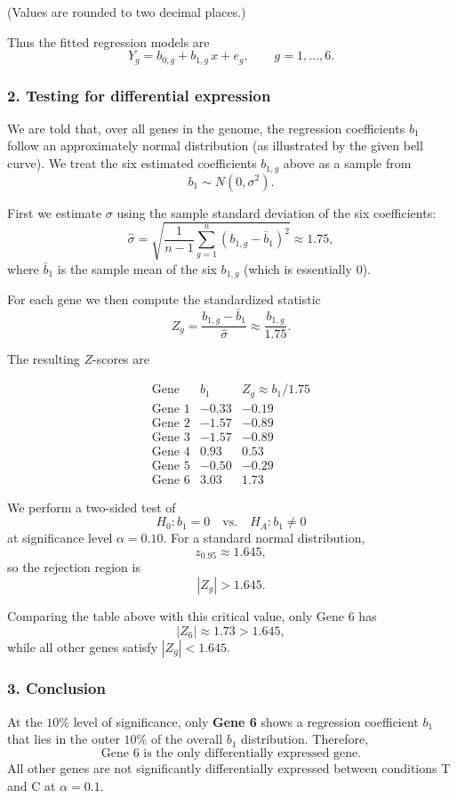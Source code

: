 (Values are rounded to two decimal places.)

Thus the fitted regression models are
\[
    Y_g = b_{0,g} + b_{1,g}\,x + e_g, \qquad g=1,\dots,6.
\]

\subsubsection*{2. Testing for differential expression}

We are told that, over all genes in the genome, the regression
coefficients $b_1$ follow an approximately normal distribution
(as illustrated by the given bell curve).  We treat the six
estimated coefficients $b_{1,g}$ above as a sample from
\[
    b_1 \sim N(0,\sigma^2).
\]

First we estimate $\sigma$ using the sample standard deviation of the six
coefficients:
\[
    \hat{\sigma}
    = \sqrt{\frac{1}{n-1}\sum_{g=1}^n (b_{1,g}-\bar{b}_1)^2}
    \approx 1.75,
\]
where $\bar{b}_1$ is the sample mean of the six $b_{1,g}$
(which is essentially $0$).

For each gene we then compute the standardized statistic
\[
    Z_g = \frac{b_{1,g}-\bar{b}_1}{\hat{\sigma}}
    \approx \frac{b_{1,g}}{1.75}.
\]

The resulting $Z$-scores are

\[
    \begin{array}{c|cc}
        \text{Gene}   & b_1   & Z_g \approx b_1/1.75 \\ \hline
        \text{Gene 1} & -0.33 & -0.19                \\
        \text{Gene 2} & -1.57 & -0.89                \\
        \text{Gene 3} & -1.57 & -0.89                \\
        \text{Gene 4} & 0.93  & 0.53                 \\
        \text{Gene 5} & -0.50 & -0.29                \\
        \text{Gene 6} & 3.03  & 1.73
    \end{array}
\]

We perform a two-sided test of
\[
    H_0: b_1 = 0 \quad \text{vs.} \quad H_A: b_1 \neq 0
\]
at significance level $\alpha = 0.10$.
For a standard normal distribution,
\[
    z_{0.95} \approx 1.645,
\]
so the rejection region is
\[
    |Z_g| > 1.645.
\]

Comparing the table above with this critical value, only Gene 6 has
\[
    |Z_6| \approx 1.73 > 1.645,
\]
while all other genes satisfy $|Z_g| < 1.645$.

\subsubsection*{3. Conclusion}

At the $10\%$ level of significance, only \textbf{Gene 6} shows a
regression coefficient $b_1$ that lies in the outer $10\%$ of the
overall $b_1$ distribution. Therefore,
\[
    \boxed{\text{Gene 6 is the only differentially expressed gene.}}
\]
All other genes are not significantly differentially expressed between
conditions T and C at $\alpha = 0.1$.

